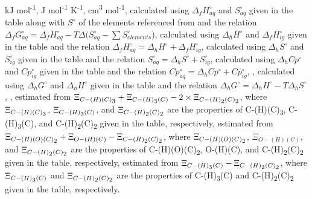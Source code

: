 {\begin{landscape}
\begin{table}
\begin{adjustbox}{width=600pt,keepaspectratio}
\begin{threeparttable}
  
  \begin{tablenotes}
     kJ mol\textsuperscript{-1},
     J mol\textsuperscript{-1} K\textsuperscript{-1},
     cm\textsuperscript{3} mol\textsuperscript{-1},
     calculated using $\Delta_{f}H^{\circ}_{aq}$ and $S^{\circ}_{aq}$ given in the table along with $S^{\circ}$ of the elements referenced from \cite{cox1989codata} and the relation $\Delta_{f}G^{\circ}_{aq} = \Delta_{f}H^{\circ}_{aq} - T\Delta(S_{aq}^{\circ}-\sum S_{elements}^{\circ}$),
     calculated using $\Delta_{h}H^{\circ}$ and $\Delta_{f}H^{\circ}_{ig}$ given in the table and the relation $\Delta_{f}H^{\circ}_{aq} = \Delta_{h}H^{\circ} + \Delta_{f}H^{\circ}_{ig}$,
     calculated using $\Delta_{h}S^{\circ}$ and $S^{\circ}_{ig}$ given in the table and the relation $S^{\circ}_{aq} = \Delta_{h}S^{\circ} + S^{\circ}_{ig}$,
     calculated using $\Delta_{h}Cp^{\circ}$ and $Cp^{\circ}_{ig}$ given in the table and the relation $Cp^{\circ}_{aq} = \Delta_{h}Cp^{\circ} + Cp^{\circ}_{ig}$,
     \cite{plyasunov2004group},
     calculated using $\Delta_{h}G^{\circ}$ and $\Delta_{h}H^{\circ}$ given in the table and the relation $\Delta_{h}G^{\circ} = \Delta_{h}H^{\circ} - T\Delta_{h} S^{\circ}$,
     \cite{domalski1993estimation},
     estimated from $\Xi_{C-(H)(C)\textsubscript{3}} + \Xi_{C-(H)\textsubscript{3}(C)} - 2\times\Xi_{C-(H)\textsubscript{2}(C)\textsubscript{2}}$, where $\Xi_{C-(H)(C)\textsubscript{3}}$, $\Xi_{C-(H)\textsubscript{3}(C)}$, and $\Xi_{C-(H)\textsubscript{2}(C)\textsubscript{2}}$ are the properties of C-(H)(C)\textsubscript{3}, C-(H)\textsubscript{3}(C), and C-(H)\textsubscript{2}(C)\textsubscript{2} given in the table, respectively,
     estimated from $\Xi_{C-(H)(O)(C)\textsubscript{2}} + \Xi_{O-(H)(C)} - \Xi_{C-(H)\textsubscript{2}(C)\textsubscript{2}}$, where $\Xi_{C-(H)(O)(C)\textsubscript{2}}$, $\Xi_{O-(H)(C)}$, and $\Xi_{C-(H)\textsubscript{2}(C)\textsubscript{2}}$ are the properties of C-(H)(O)(C)\textsubscript{2}, O-(H)(C), and C-(H)\textsubscript{2}(C)\textsubscript{2} given in the table, respectively,
      estimated from $\Xi_{C-(H)\textsubscript{3}(C)} - \Xi_{C-(H)\textsubscript{2}(C)\textsubscript{2}}$, where $\Xi_{C-(H)\textsubscript{3}(C)}$ and $\Xi_{C-(H)\textsubscript{2}(C)\textsubscript{2}}$ are the properties of C-(H)\textsubscript{3}(C) and C-(H)\textsubscript{2}(C)\textsubscript{2} given in the table, respectively.
    

\end{tablenotes}
\end{threeparttable}
\end{adjustbox}
\end{table}
\end{landscape}}
